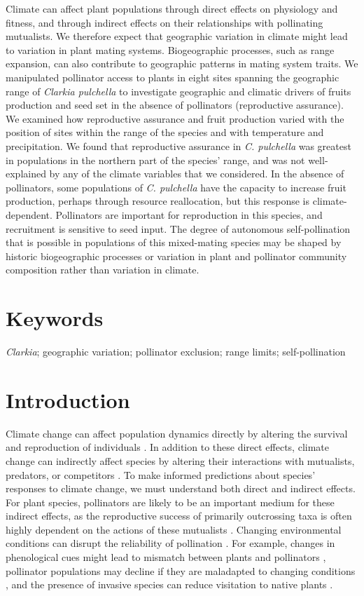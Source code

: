 \documentclass{article}
\begin{document}
Climate can affect plant populations through direct effects on physiology and fitness, and through indirect effects on their relationships with pollinating mutualists. We therefore expect that geographic variation in climate might lead to variation in plant mating systems. Biogeographic processes, such as range expansion, can also contribute to geographic patterns in mating system traits. We manipulated pollinator access to plants in eight sites spanning the geographic range of \textit{Clarkia pulchella} to investigate geographic and climatic drivers of fruits production and seed set in the absence of pollinators (reproductive assurance). We examined how reproductive assurance and fruit production varied with the position of sites within the range of the species and with temperature and precipitation. We found that reproductive assurance in \textit{C. pulchella} was greatest in populations in the northern part of the species' range, and was not well-explained by any of the climate variables that we considered. In the absence of pollinators, some populations of \textit{C. pulchella} have the capacity to increase fruit production, perhaps through resource reallocation, but this response is climate-dependent. Pollinators are important for reproduction in this species, and recruitment is sensitive to seed input. The degree of autonomous self-pollination that is possible in populations of this mixed-mating species may be shaped by historic biogeographic processes or variation in plant and pollinator community composition rather than variation in climate.


\section*{Keywords}
\textit{Clarkia}; geographic variation; pollinator exclusion; range limits; self-pollination

\section*{Introduction}

Climate change can affect population dynamics directly by altering the survival and reproduction of individuals \citep{mcgraw2015northward}. In addition to these direct effects, climate change can indirectly affect species by altering their interactions with mutualists, predators, or competitors \citep{miller2015functional}. To make informed predictions about species' responses to climate change, we must understand both direct and indirect effects. For plant species, pollinators are likely to be an important medium for these indirect effects, as the reproductive success of primarily outcrossing taxa is often highly dependent on the actions of these mutualists \citep{burd1994principle, ashman2004pollen}. Changing environmental conditions can disrupt the reliability of pollination \citep{kudo2004does}. For example, changes in phenological cues might lead to mismatch between plants and pollinators \citep{kudo2013early}, pollinator populations may decline if they are maladapted to changing conditions \citep{williams2007vulnerability}, and the presence of invasive species can reduce visitation to native plants \citep{bjerknes2007alien, bruckman2016pollination}.  
\end{document}
